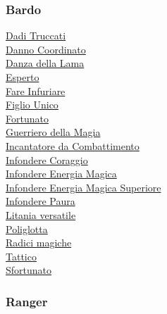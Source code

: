 \begin{multicols}{3}
{\begin{flushleft}
\titlespacing*{\subsubsection}{0pt}{0.5em}{0.5em}\subsubsection*{Bardo}

\hyperlink{Dadi Truccati}{Dadi Truccati}\\
\hyperlink{Danno Coordinato}{Danno Coordinato}\\
\hyperlink{Danza della Lama}{Danza della Lama}\\
\hyperlink{Esperto}{Esperto}\\
\hyperlink{Fare Infuriare}{Fare Infuriare}\\
\hyperlink{Figlio Unico}{Figlio Unico}\\
\hyperlink{Fortunato}{Fortunato}\\
\hyperlink{Guerriero della Magia}{Guerriero della Magia}\\
\hyperlink{Incantatore da Combattimento}{Incantatore da Combattimento}\\
\hyperlink{Infondere Coraggio}{Infondere Coraggio}\\
\hyperlink{Infondere Energia Magica}{Infondere Energia Magica}\\
\hyperlink{Infondere Energia Magica Superiore}{Infondere Energia Magica Superiore}\\
\hyperlink{Infondere Paura}{Infondere Paura}\\
\hyperlink{Litania versatile}{Litania versatile}\\
\hyperlink{Poliglotta}{Poliglotta}\\
\hyperlink{Radici magiche}{Radici magiche}\\
\hyperlink{Tattico}{Tattico}\\
\hyperlink{Sfortunato}{Sfortunato}

\titlespacing*{\subsubsection}{0pt}{0.5em}{0.5em}\subsubsection*{Ranger}


\end{flushleft}}
\end{multicols}
